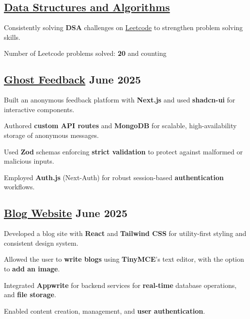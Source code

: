 \subsection{{\href{https://github.com/thepratikguptaa/DSA-CPP}{Data Structures and Algorithms}}}
\begin{zitemize}
\item Consistently solving \textbf{DSA} challenges on \href{https://leetcode.com/u/thepratikguptaa/}{Leetcode} to strengthen problem solving skills.
\item Number of Leetcode problems solved: \textbf{20} and counting

\end{zitemize}

\subsection{{\href{https://ghostfeedback.vercel.app/u/Pratik}{Ghost Feedback} \hfill June 2025}}
\begin{zitemize}
\item Built an anonymous feedback platform with \textbf{Next.js} and used \textbf{shadcn-ui} for interactive components.
\item Authored \textbf{custom API routes} and \textbf{MongoDB} for scalable, high-availability storage of anonymous messages.
\item Used \textbf{Zod} schemas enforcing \textbf{strict validation} to protect against malformed or malicious inputs.
\item Employed \textbf{Auth.js} (Next-Auth) for robust session-based \textbf{authentication} workflows.
\end{zitemize}

\subsection{{\href{https://blog-site-thepratikguptaas-projects.vercel.app/}{Blog Website} \hfill June 2025}}
\begin{zitemize}
\item Developed a blog site with \textbf{React} and \textbf{Tailwind CSS}  for utility-first styling and consistent design system.
\item Allowed the user to \textbf{write blogs} using \textbf{TinyMCE}'s text editor, with the option to \textbf{add an image}.
\item Integrated \textbf{Appwrite} for backend services for \textbf{real-time} database operations, and \textbf{file storage}.
\item Enabled content creation, management, and \textbf{user authentication}.

\end{zitemize}

